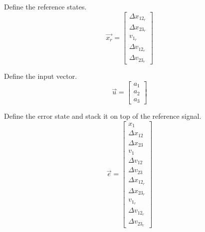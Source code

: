 \documentclass[12pt,onecolumn,reqno]{amsart}
\begin{document}
Define the reference states.
\begin{equation}
  \vec{x_{r}} = 
  \begin{bmatrix}
    \Delta x_{12_{r}} \\
    \Delta x_{23_{r}} \\
    v_{1_{r}}         \\
    \Delta v_{12_{r}} \\
    \Delta v_{23_{r}}
  \end{bmatrix}
\end{equation}

Define the input vector.
\begin{equation}
  \vec{u} = 
  \begin{bmatrix}
    a_{1} \\
    a_{2} \\
    a_{3}
  \end{bmatrix}
\end{equation}

Define the error state and stack it on top of the reference signal.
\begin{equation}
  \vec{e} = 
  \begin{bmatrix}
    x_{1}             \\
    \Delta x_{12}     \\
    \Delta x_{23}     \\
    v_{1}             \\
    \Delta v_{12}     \\
    \Delta v_{23}     \\ 
    \Delta x_{12_{r}} \\
    \Delta x_{23_{r}} \\
    v_{1_{r}}         \\
    \Delta v_{12_{r}} \\
    \Delta v_{23_{r}}
  \end{bmatrix}
\end{equation}
\end{document}
